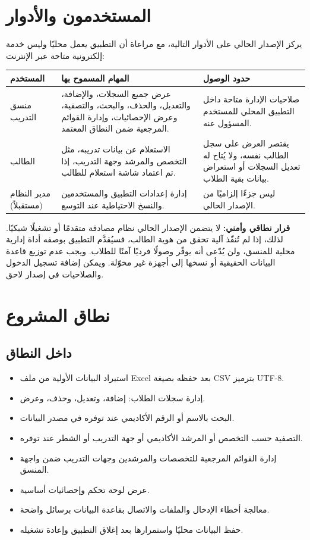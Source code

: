 \documentclass[12pt,a4paper]{article}
\begin{document}
\section{المستخدمون والأدوار}
يركز الإصدار الحالي على الأدوار التالية، مع مراعاة أن التطبيق يعمل محليًا وليس خدمة إلكترونية متاحة عبر الإنترنت:

\begin{tabularx}{\textwidth}{|p{3cm}|Y|Y|}
\hline
\textbf{المستخدم} & \textbf{المهام المسموح بها} & \textbf{حدود الوصول}\\ \hline
منسق التدريب & عرض جميع السجلات، والإضافة، والتعديل، والحذف، والبحث، والتصفية، وعرض الإحصائيات، وإدارة القوائم المرجعية ضمن النطاق المعتمد. & صلاحيات الإدارة متاحة داخل التطبيق المحلي للمستخدم المسؤول عنه.\\ \hline
الطالب & الاستعلام عن بيانات تدريبه، مثل التخصص والمرشد وجهة التدريب، إذا تم اعتماد شاشة استعلام للطالب. & يقتصر العرض على سجل الطالب نفسه، ولا يُتاح له تعديل السجلات أو استعراض بيانات بقية الطلاب.\\ \hline
مدير النظام (مستقبلاً) & إدارة إعدادات التطبيق والمستخدمين والنسخ الاحتياطية عند التوسع. & ليس جزءًا إلزاميًا من الإصدار الحالي.\\ \hline
\end{tabularx}

\textbf{قرار نطاقي وأمني:} لا يتضمن الإصدار الحالي نظام مصادقة متقدمًا أو تشغيلًا شبكيًا. لذلك، إذا لم تُنفّذ آلية تحقق من هوية الطالب، فسيُقدَّم التطبيق بوصفه أداة إدارية محلية للمنسق، ولن يُدّعى أنه يوفّر وصولًا فرديًا آمنًا للطلاب. ويجب عدم توزيع قاعدة البيانات الحقيقية أو نسخها إلى أجهزة غير مخوّلة. ويمكن إضافة تسجيل الدخول والصلاحيات في إصدار لاحق.

\section{نطاق المشروع}
\subsection{داخل النطاق}
\begin{itemize}
\item استيراد البيانات الأولية من ملف Excel بعد حفظه بصيغة CSV بترميز UTF-8.
\item إدارة سجلات الطلاب: إضافة، وتعديل، وحذف، وعرض.
\item البحث بالاسم أو الرقم الأكاديمي عند توفره في مصدر البيانات.
\item التصفية حسب التخصص أو المرشد الأكاديمي أو جهة التدريب أو الشطر عند توفره.
\item إدارة القوائم المرجعية للتخصصات والمرشدين وجهات التدريب ضمن واجهة المنسق.
\item عرض لوحة تحكم وإحصائيات أساسية.
\item معالجة أخطاء الإدخال والملفات والاتصال بقاعدة البيانات برسائل واضحة.
\item حفظ البيانات محليًا واستمرارها بعد إغلاق التطبيق وإعادة تشغيله.
\end{itemize}
\end{document}

